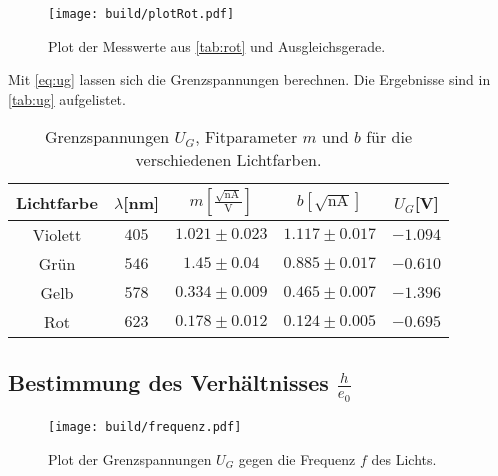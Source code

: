 \begin{figure}[H]
  \centering
  \texttt{[image: build/plotRot.pdf]}
  \caption{Plot der Messwerte aus \autoref{tab:rot} und Ausgleichsgerade.}
  \label{fig:plot_rot}
\end{figure}

Mit \autoref{eq:ug} lassen sich die Grenzspannungen berechnen. Die Ergebnisse sind in \autoref{tab:ug} aufgelistet.
\begin{table}
  \centering
  \begin{tabular}{|c|c|c|c|c|}
    \toprule
    Lichtfarbe & $λ$[nm] & $m[\frac{\sqrt{\text{nA}}}{\text{V}}]$ & $b[\sqrt{\text{nA}}]$ & $U_G$[V]\\
    \midrule
    Violett & $405$ & $1.021\pm 0.023$ & $1.117\pm 0.017$ & $-1.094$\\
    Grün & $546$ & $1.45\pm 0.04$ & $0.885\pm 0.017$ & $-0.610$\\
    Gelb & $578$ & $0.334\pm 0.009$ & $0.465\pm 0.007$ & $-1.396$\\
    Rot & $623$ & $0.178\pm 0.012$ & $0.124\pm 0.005$ & $-0.695$\\
    \bottomrule
  \end{tabular}
  \caption{Grenzspannungen $U_G$, Fitparameter $m$ und $b$ für die verschiedenen Lichtfarben.}
  \label{tab:ug}
\end{table}

\newpage

\subsection{Bestimmung des Verhältnisses $\frac{h}{e_0}$}

\begin{figure}
  \centering
  \texttt{[image: build/frequenz.pdf]}
  \caption{Plot der Grenzspannungen $U_G$ gegen die Frequenz $f$ des Lichts.}
  \label{fig:frequenz}
\end{figure}

